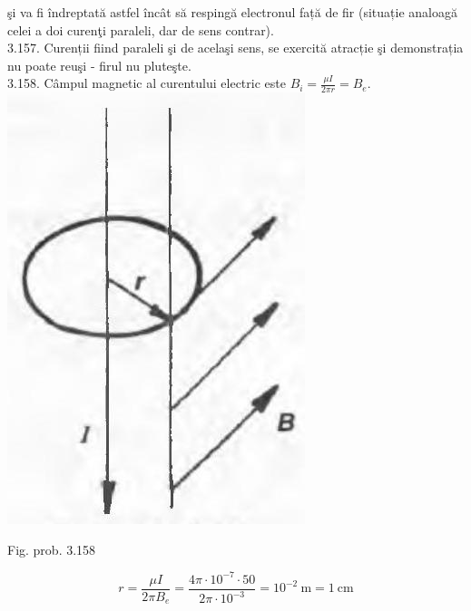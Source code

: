 \documentclass[10pt]{article}
\begin{document}
şi va fi îndreptată astfel încât să respingă electronul față de fir (situație analoagă celei a doi curenţi paraleli, dar de sens contrar).\\
3.157. Curenții fiind paraleli şi de acelaşi sens, se exercită atracție şi demonstrația nu poate reuşi - firul nu pluteşte.\\
3.158. Câmpul magnetic al curentului electric este $B_{i}=\frac{\mu I}{2 \pi r}=B_{e}$.\\
\includegraphics[max width=\textwidth, center]{2025_07_01_5b3ff9fa0d508c8e9f17g-372}

Fig. prob. 3.158

$$
r=\frac{\mu I}{2 \pi B_{e}}=\frac{4 \pi \cdot 10^{-7} \cdot 50}{2 \pi \cdot 10^{-3}}=10^{-2} \mathrm{~m}=1 \mathrm{~cm}
$$
\end{document}
